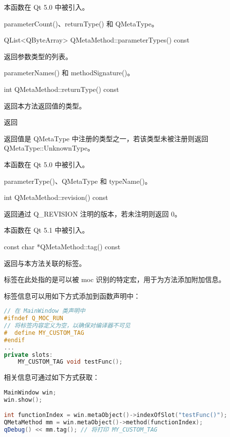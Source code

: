 本函数在 Qt 5.0 中被引入。

\begin{seeAlso}
parameterCount()、returnType() 和 QMetaType。
\end{seeAlso}

QList<QByteArray> QMetaMethod::parameterTypes() const

返回参数类型的列表。

\begin{seeAlso}
parameterNames() 和 methodSignature()。
\end{seeAlso}

int QMetaMethod::returnType() const

返回本方法返回值的类型。

返回

返回值是 QMetaType 中注册的类型之一，若该类型未被注册则返回 QMetaType::UnknownType。

本函数在 Qt 5.0 中被引入。

\begin{seeAlso}
parameterType()、QMetaType 和 typeName()。
\end{seeAlso}

int QMetaMethod::revision() const

返回通过 Q\_REVISION 注明的版本，若未注明则返回 0。

本函数在 Qt 5.1 中被引入。

const char *QMetaMethod::tag() const

返回与本方法关联的标签。

标签在此处指的是可以被 moc 识别的特定宏，用于为方法添加附加信息。

标签信息可以用如下方式添加到函数声明中：

\begin{lstlisting}[language=C++]
// 在 MainWindow 类声明中
#ifndef Q_MOC_RUN
// 将标签内容定义为空，以确保对编译器不可见
#  define MY_CUSTOM_TAG
#endif
...
private slots:
	MY_CUSTOM_TAG void testFunc();
\end{lstlisting}

相关信息可通过如下方式获取：

\begin{lstlisting}[language=C++]
MainWindow win;
win.show();

int functionIndex = win.metaObject()->indexOfSlot("testFunc()");
QMetaMethod mm = win.metaObject()->method(functionIndex);
qDebug() << mm.tag(); // 将打印 MY_CUSTOM_TAG
\end{lstlisting}


